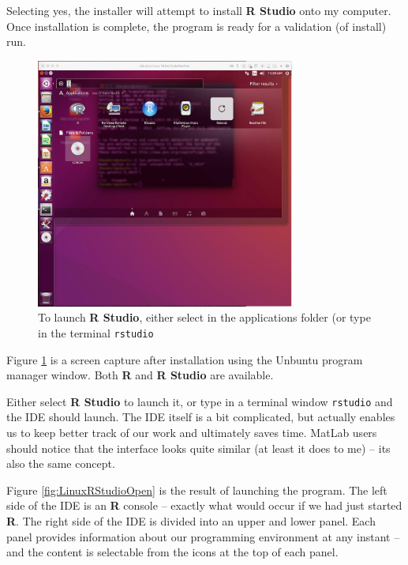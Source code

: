 Selecting yes, the installer will attempt to install \textbf{R Studio} onto my computer. 
Once installation is complete, the program is ready for a validation (of install) run.

\begin{figure}[h!] %
   \centering
   \includegraphics[width=3.35in]{./1-Introduction/LinuxRStudioSelect.jpg} 
   \caption{To launch \textbf{R Studio}, either select in the applications folder (or type in the terminal \texttt{rstudio}}
\label{fig:LinuxRStudioSelect}
\end{figure}

\clearpage
Figure \ref{fig:LinuxRStudioSelect} is a screen capture after installation using the Unbuntu program manager window.  
Both \textbf{R} and \textbf{R Studio} are available.  

Either select \textbf{R Studio} to launch it, or type in a terminal window \texttt{rstudio} and the IDE should launch.
The IDE itself is a bit complicated, but actually enables us to keep better track of our work and ultimately saves time.
MatLab users should notice that the interface looks quite similar (at least it does to me) -- its also the same concept.

Figure \ref{fig:LinuxRStudioOpen} is the result of launching the program.  
The left side of the IDE is an \textbf{R} console -- exactly what would occur if we had just started \textbf{R}.
The right side of the IDE is divided into an upper and lower panel.  
Each panel  provides information about our programming environment at any instant -- and the content is selectable from the icons at the top of each panel.


